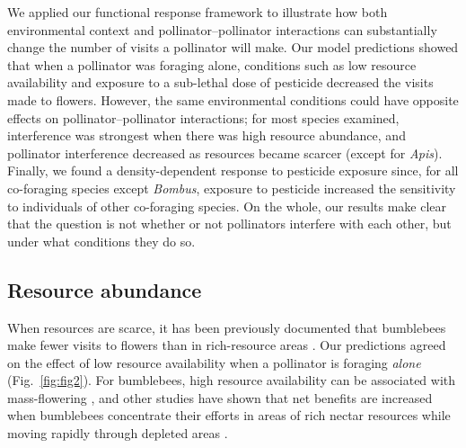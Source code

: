 \begin{refsection}
We applied our functional response framework to illustrate how both environmental context and pollinator--pollinator interactions can substantially change the number of visits a pollinator will make. Our model predictions showed that when a pollinator was foraging alone, conditions such as low resource availability and exposure to a sub-lethal dose of pesticide decreased the visits made to flowers. However, the same environmental conditions could have opposite effects on pollinator--pollinator interactions; for most species examined, interference was strongest when there was high resource abundance, and pollinator interference decreased as resources became scarcer (except for \textit{Apis}). Finally, we found a density-dependent response to pesticide exposure since, for all co-foraging species except \textit{Bombus}, exposure to pesticide increased the sensitivity to individuals of other co-foraging species. On the whole, our results make clear that the question is not whether or not pollinators interfere with each other, but under what conditions they do so.


\subsection*{Resource abundance}

When resources are scarce, it has been previously documented that bumblebees make fewer visits to flowers than in rich-resource areas \citep{heinrich_bumblebee_2004,westphal_foraging_2006}. Our predictions agreed on the effect of low resource availability when a pollinator is foraging \textit{alone} (Fig.~\ref{fig:fig2}). For bumblebees, high resource availability can be associated with mass-flowering \citep{westphal_mass_2003}, and other studies have shown that net benefits are increased when bumblebees concentrate their efforts in areas of rich nectar resources while moving rapidly through depleted areas \citep{heinrich_resource_1979}.


\end{refsection}
